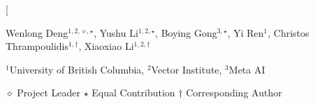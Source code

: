\documentclass{article}
\theoremstyle{plain}
\theoremstyle{definition}
\theoremstyle{remark}
\begin{document}
\twocolumn[
\begin{center}


    {\normalsize
    Wenlong Deng$^{1,2,\diamond,\star}$,
    Yushu Li$^{1,2,\star}$,
    Boying Gong$^{3,\star}$,
    Yi Ren$^{1}$,
    Christos Thrampoulidis$^{1,\dag}$,
    Xiaoxiao Li$^{1,2,\dag}$
    }
    
    \vspace{0.2cm}

    {\small
    $^1$University of British Columbia, 
    $^2$Vector Institute, 
    $^3$Meta AI
    }

    \vspace{0.2cm}

    {\footnotesize
    $\diamond$ Project Leader \quad
    $\star$ Equal Contribution \quad
    $\dag$ Corresponding Author
    }

    \vspace{0.3cm}
    \setlength{\fboxsep}{15pt} 
    

\end{center}
\end{document}
